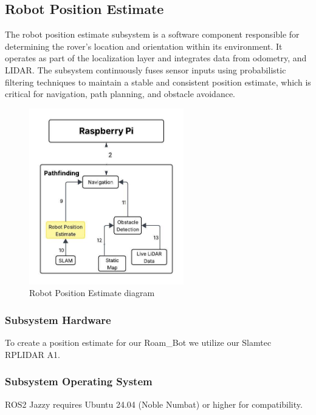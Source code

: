 \newpage
\subsection{Robot Position Estimate}
The robot position estimate subsystem is a software component responsible for determining the rover's location and orientation within its environment. It operates as part of the localization layer and integrates data from odometry, and LIDAR. The subsystem continuously fuses sensor inputs using probabilistic filtering techniques to maintain a stable and consistent position estimate, which is critical for navigation, path planning, and obstacle avoidance.

\begin{figure}[h!]
 	\centering
  	\includegraphics[width=0.60\textwidth]{images/pathfinding2nd/Data_Flow_RobotPosition.jpeg}
  \caption{Robot Position Estimate diagram}
 \end{figure}

 \subsubsection{Subsystem Hardware}
To create a position estimate for our Roam\_Bot we utilize our Slamtec RPLIDAR A1. 

\subsubsection{Subsystem Operating System}
ROS2 Jazzy requires Ubuntu 24.04 (Noble Numbat) or higher for compatibility.

